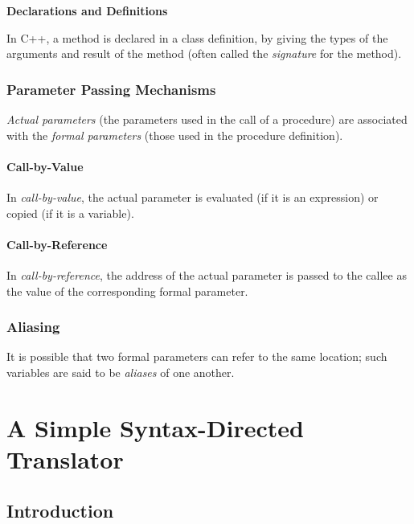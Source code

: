 \documentclass[a4paper,twoside]{book}
\begin{document}
\begin{framed}
    \begin{center}
        \textbf{{\large Declarations and Definitions}}
    \end{center}

    In C++, a method is declared in a class definition, by giving the types of the arguments and result of the method (often called the \textit{signature} for the method).
\end{framed}

\subsection{Parameter Passing Mechanisms}

\textit{Actual parameters} (the parameters used in the call of a procedure) are associated with the \textit{formal parameters} (those used in the procedure definition).

\subsubsection{Call-by-Value}

In \textit{call-by-value}, the actual parameter is evaluated (if it is an expression) or copied (if it is a variable).

\subsubsection{Call-by-Reference}

In \textit{call-by-reference}, the address of the actual parameter is passed to the callee as the value of the corresponding formal parameter.

\subsection{Aliasing}

It is possible that two formal parameters can refer to the same location; such variables are said to be \textit{aliases} of one another.

\chapter{A Simple Syntax-Directed Translator}
\section{Introduction} 
\end{document}
